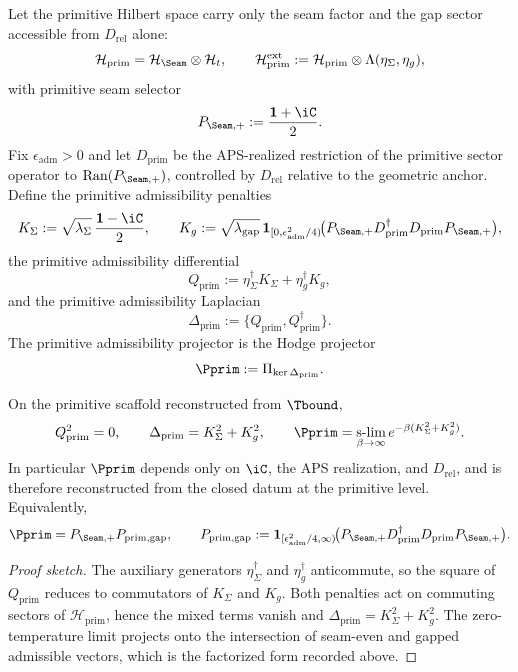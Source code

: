 \begin{definition}
\label{def:admissibility-complex}
\label{def:primitive-admissibility-complex}
Let the primitive Hilbert space carry only the seam factor and the gap sector accessible from
$D_{\mathrm{rel}}$ alone:
\[
\mathcal H_{\mathrm{prim}}=\mathcal H_{\Seam}\otimes\mathcal H_t,
\qquad
\mathcal H_{\mathrm{prim}}^{\mathrm{ext}}
:=
\mathcal H_{\mathrm{prim}}\otimes\Lambda(\eta_\Sigma,\eta_g),
\]
with primitive seam selector
\[
P_{\Seam,+}:=\frac{\mathbf 1+\iC}{2}.
\]
Fix $\epsilon_{\mathrm{adm}}>0$ and let $D_{\mathrm{prim}}$ be the APS-realized restriction of
the primitive sector operator to $\mathrm{Ran}(P_{\Seam,+})$, controlled by $D_{\mathrm{rel}}$
relative to the geometric anchor. Define the primitive admissibility penalties
\[
K_\Sigma:=\sqrt{\lambda_\Sigma}\,\frac{\mathbf 1-\iC}{2},
\qquad
K_g:=\sqrt{\lambda_{\mathrm{gap}}}\,
\mathbf 1_{[0,\epsilon_{\mathrm{adm}}^2/4)}\!
\bigl(P_{\Seam,+}D_{\mathrm{prim}}^\dagger D_{\mathrm{prim}}P_{\Seam,+}\bigr),
\]
the primitive admissibility differential
\[
Q_{\mathrm{prim}}
:=
\eta_\Sigma^\dagger K_\Sigma
+\eta_g^\dagger K_g,
\]
and the primitive admissibility Laplacian
\[
\Delta_{\mathrm{prim}}:=\{Q_{\mathrm{prim}},Q_{\mathrm{prim}}^\dagger\}.
\]
The primitive admissibility projector is the Hodge projector
\[
\Pprim
:=
\Pi_{\ker\Delta_{\mathrm{prim}}}.
\]
\end{definition}

\begin{lemma}
\label{lem:admissibility-nilpotency}
\label{lem:hodge-admissibility-projector}
\label{lem:primitive-admissibility-nilpotency}
On the primitive scaffold reconstructed from $\Tbound$,
\[
Q_{\mathrm{prim}}^2=0,
\qquad
\Delta_{\mathrm{prim}}
=
K_\Sigma^2+K_g^2,
\qquad
\Pprim
=
\operatorname*{s-lim}_{\beta\to\infty}e^{-\beta(K_\Sigma^2+K_g^2)}.
\]
In particular $\Pprim$ depends only on $\iC$, the APS realization, and $D_{\mathrm{rel}}$, and
is therefore reconstructed from the closed datum at the primitive level. Equivalently,
\[
\Pprim=P_{\Seam,+}P_{\mathrm{prim,gap}},
\qquad
P_{\mathrm{prim,gap}}
:=
\mathbf 1_{[\epsilon_{\mathrm{adm}}^2/4,\infty)}
\!\bigl(P_{\Seam,+}D_{\mathrm{prim}}^\dagger D_{\mathrm{prim}}P_{\Seam,+}\bigr).
\]
\end{lemma}

\begin{proof}[Proof sketch]
The auxiliary generators $\eta_\Sigma^\dagger$ and $\eta_g^\dagger$ anticommute, so the square
of $Q_{\mathrm{prim}}$ reduces to commutators of $K_\Sigma$ and $K_g$. Both penalties act on
commuting sectors of $\mathcal H_{\mathrm{prim}}$, hence the mixed terms vanish and
$\Delta_{\mathrm{prim}}=K_\Sigma^2+K_g^2$. The zero-temperature limit projects onto the
intersection of seam-even and gapped admissible vectors, which is the factorized form recorded
above.
\end{proof}

